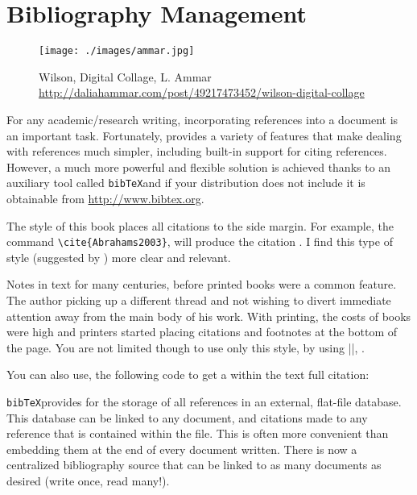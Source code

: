 \chapter{Bibliography Management} 

\begin{figure}[p]
\texttt{[image: ./images/ammar.jpg]}
\caption{Wilson, Digital Collage, L. Ammar \protect\url{http://daliahammar.com/post/49217473452/wilson-digital-collage}}
\end{figure}
 

       
\def\bibtex{\texttt{bibTeX\xspace}}

For any academic/research writing, incorporating references into a document is an important task. Fortunately, \latex provides  a variety of features that make dealing with references much simpler, including built-in support for citing references. However, a much more powerful and flexible solution is achieved thanks to an auxiliary tool called \bibtex and if your \latex  distribution does not include it is obtainable from \url{http://www.bibtex.org}.


The style of this book places all citations to the side margin. For example, the command  \verb+\cite{Abrahams2003}+, will produce the citation \cite{Abrahams2003}. I find this type of style (suggested by \cite{Tufte1997}) more clear and relevant.

Notes in text for many centuries, before printed books were a common feature. The author picking up a different thread and not wishing to divert immediate attention away from the main body of his work. With printing, the costs of books were high and printers started placing citations and footnotes at the bottom of the page. You are not limited though to use only this style, by using |\cite{Bringhurst2005}|, \citet{Bringhurst2005}.

You can also use, the following code to get a within the text full citation:





\bibtex provides for the storage of all references in an external, flat-file database. This database can be linked to any \latex document, and citations made to any reference that is contained within the file. This is often more convenient than embedding them at the end of every document written. There is now a centralized bibliography source that can be linked to as many documents as desired (write once, read many!). 

